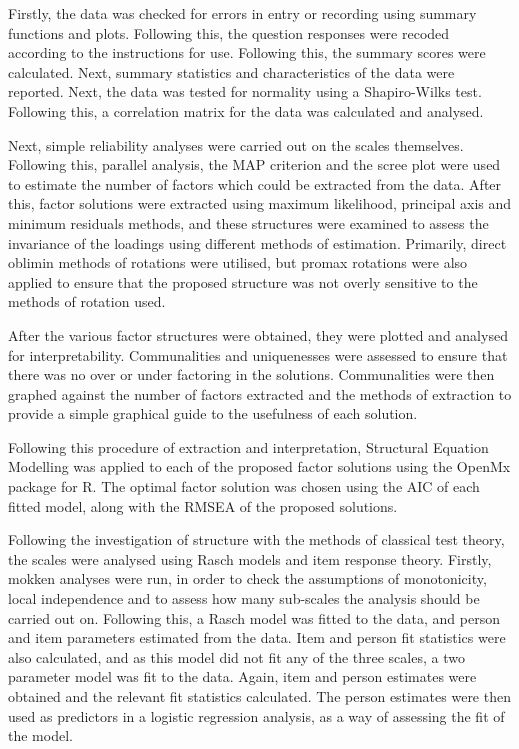 Firstly, the data was checked for errors in entry or recording using summary functions and plots. Following this, the question responses were recoded according to the instructions for use. Following this, the summary scores were calculated. Next, summary statistics and characteristics of the data were reported. Next, the data was tested for normality using a Shapiro-Wilks test. Following this, a correlation matrix for the data was calculated and analysed.

Next, simple reliability analyses were carried out on the scales themselves. Following this, parallel analysis, the MAP criterion and the scree plot were used to estimate the number of factors which could be extracted from the data. After this, factor solutions were extracted using maximum likelihood, principal axis and minimum residuals methods, and these structures were examined to assess the invariance of the loadings using different methods of estimation. Primarily, direct oblimin methods of rotations were utilised, but promax rotations were also applied to ensure that the proposed structure was not overly sensitive to the methods of rotation used.

After the various factor structures were obtained, they were plotted and analysed for interpretability. Communalities and uniquenesses were assessed to ensure that there was no over or under factoring in the solutions. Communalities were then graphed against the number of factors extracted and the methods of extraction to provide a simple graphical guide to the usefulness of each solution.

Following this procedure of extraction and interpretation, Structural Equation Modelling was applied to each of the proposed factor solutions using the OpenMx package for R. The optimal factor solution was chosen using the AIC of each fitted model, along with the RMSEA of the proposed solutions.


Following the investigation of structure with the methods of classical test theory, the scales were analysed using Rasch models and item response theory. Firstly, mokken analyses were run, in order to check the assumptions of monotonicity, local independence and to assess how many sub-scales the analysis should be carried out on. Following this, a Rasch model was fitted to the data, and person and item parameters estimated from the data. Item and person fit statistics were also calculated, and as this model did not fit any of the three scales, a two parameter model was fit to the data. Again, item and person estimates were obtained and the relevant fit statistics calculated. The person estimates were then used as predictors in a logistic regression analysis, as a way of assessing the fit of the model.


